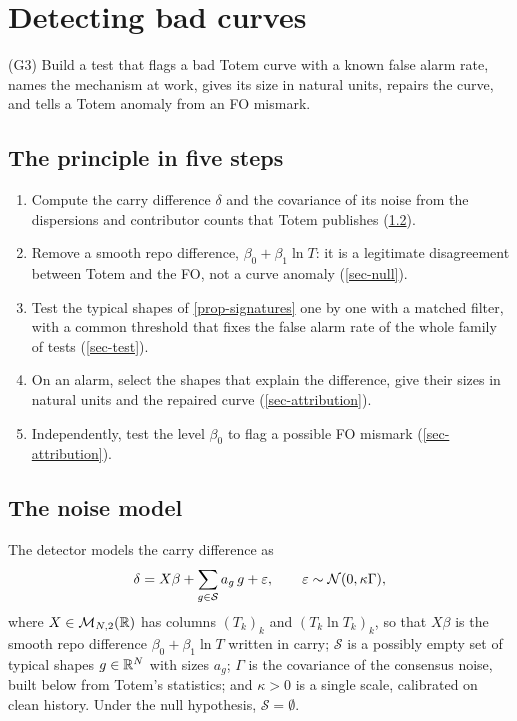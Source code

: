\section{Detecting bad curves}\label{sec-detection}

\begin{objectif}
(G3) Build a test that flags a bad Totem curve with a known false alarm rate, names the mechanism at work, gives its
size in natural units, repairs the curve, and tells a Totem anomaly from an FO mismark.
\end{objectif}

\subsection{The principle in five steps}
\begin{enumerate}
\item Compute the carry difference $\delta$ and the covariance of its noise from the dispersions and contributor
counts that Totem publishes (\cref{sec-noise}).
\item Remove a smooth repo difference, $\beta_0+\beta_1\ln T$: it is a legitimate disagreement between Totem and the
FO, not a curve anomaly (\cref{sec-null}).
\item Test the typical shapes of \cref{prop-signatures} one by one with a matched filter, with a common threshold that
fixes the false alarm rate of the whole family of tests (\cref{sec-test}).
\item On an alarm, select the shapes that explain the difference, give their sizes in natural units and the repaired
curve (\cref{sec-attribution}).
\item Independently, test the level $\beta_0$ to flag a possible FO mismark (\cref{sec-attribution}).
\end{enumerate}

\subsection{The noise model}\label{sec-noise}
\begin{definition}\label{def-obs}
The detector models the carry difference as
\begin{equation}\label{eq-obs}
\delta=X\beta+\sum_{g\in\mathcal S}a_g\,g+\varepsilon, \qquad\varepsilon\sim\mathcal{N}(0, \kappa\Gamma),
\end{equation}
where $X\in\mathcal{M}_{N,2}(\mathbb{R})$ has columns $(T_k)_k$ and $(T_k\ln T_k)_k$, so that $X\beta$ is the smooth repo difference
$\beta_0+\beta_1\ln T$ written in carry; $\mathcal S$ is a possibly empty set of typical shapes $g\in\mathbb{R}^N$ with sizes
$a_g$; $\Gamma$ is the covariance of the consensus noise, built below from Totem's statistics; and $\kappa>0$ is a
single scale, calibrated on clean history. Under the null hypothesis, $\mathcal S=\emptyset$.
\end{definition}

